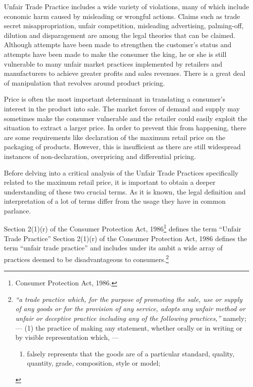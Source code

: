 \begin{multicols}{2}
\noi
Unfair Trade Practice includes a wide variety of violations, many of which include economic
harm caused by misleading or wrongful actions. Claims such as trade secret misappropriation,
unfair competition, misleading advertising, palming-off, dilution and disparagement are among
the legal theories that can be claimed. Although attempts have been made to strengthen the
customer's status and attempts have been made to make the consumer the king, he or she is still
vulnerable to many unfair market practices implemented by retailers and manufacturers to achieve greater profits and sales revenues. There is a great deal of manipulation that revolves
around product pricing.

\noi
Price is often the most important determinant in translating a consumer’s interest in the product
into sale. The market forces of demand and supply may sometimes make the consumer
vulnerable and the retailer could easily exploit the situation to extract a larger price. In order to
prevent this from happening, there are some requirements like declaration of the maximum
retail price on the packaging of products. However, this is insufficient as there are still
widespread instances of non-declaration, overpricing and differential pricing.


\noi
Before delving into a critical analysis of the Unfair Trade Practices specifically related to the
maximum retail price, it is important to obtain a deeper understanding of these two crucial
terms. As it is known, the legal definition and interpretation of a lot of terms differ from the usage
they have in common parlance.

\noi
Section 2(1)(r) of the Consumer Protection Act, 1986\footnote{Consumer Protection Act, 1986.} defines the term “Unfair Trade Practice” Section 2(1)(r) of the Consumer Protection Act, 1986 defines the term “unfair trade practice” and includes under its ambit a wide array of practices deemed to be disadvantageous to consumers.\footnote{\textit{“a trade practice which, for the purpose of promoting the sale, use or supply of any goods or for the provision of any service, adopts any unfair method or unfair or deceptive practice including any of the following practices,”} namely; —
(1) the practice of making any statement, whether orally or in writing or by visible representation which, —
\begin{enumerate}[label=(\roman*)]
\item falsely represents that the goods are of a particular standard, quality, quantity, grade, composition, style or
model;


\end{enumerate}}
\end{multicols}
